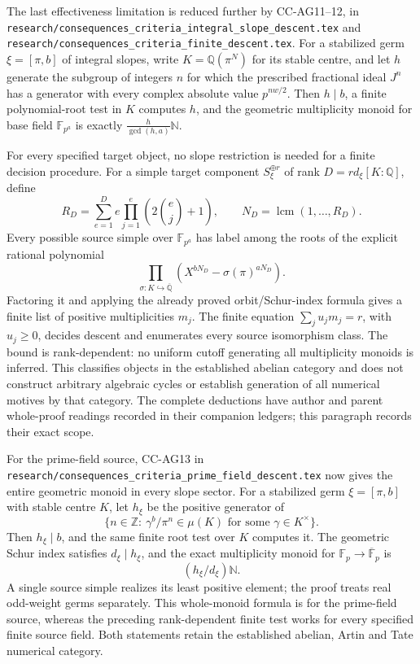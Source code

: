The last effectiveness limitation is reduced further by CC-AG11--12,
in \texttt{research/consequences\_criteria\_integral\_slope\_descent.tex}
and \texttt{research/consequences\_criteria\_finite\_descent.tex}.
For a stabilized germ $\xi=[\pi,b]$ of integral slopes, write
$K=\mathbb Q(\pi^N)$ for its stable centre, and let $h$ generate
the subgroup of integers $n$ for which the prescribed fractional
ideal $J^n$ has a generator with every complex absolute value
$p^{nw/2}$. Then $h\mid b$, a finite polynomial-root test in
$K$ computes $h$, and the geometric multiplicity monoid for
base field $\mathbb F_{p^a}$ is exactly
$\frac{h}{\gcd(h,a)}\mathbb N$.

For every specified target object, no slope restriction is
needed for a finite decision procedure. For a simple target
component $S_\xi^{\oplus r}$ of rank
$D=r d_\xi[K:\mathbb Q]$, define
\[
 R_D=\sum_{e=1}^D e\prod_{j=1}^e
       \left(2\binom ej+1\right),\qquad
 N_D=\operatorname{lcm}(1,\ldots,R_D).
\]
Every possible source simple over $\mathbb F_{p^a}$ has label
among the roots of the explicit rational polynomial
\[
 \prod_{\sigma:K\hookrightarrow\overline{\mathbb Q}}
       \left(X^{bN_D}-\sigma(\pi)^{aN_D}\right).
\]
Factoring it and applying the already proved orbit/Schur-index
formula gives a finite list of positive multiplicities $m_j$.
The finite equation $\sum_j u_jm_j=r$, with $u_j\ge0$,
decides descent and enumerates every source isomorphism class.
The bound is rank-dependent: no uniform cutoff generating
all multiplicity monoids is inferred. This classifies objects
in the established abelian category and does not construct
arbitrary algebraic cycles or establish generation of all
numerical motives by that category. The complete deductions
have author and parent whole-proof readings recorded in their
companion ledgers; this paragraph records their exact scope.

For the prime-field source, CC-AG13 in
\texttt{research/consequences\_criteria\_prime\_field\_descent.tex}
now gives the entire geometric monoid in every slope sector.
For a stabilized germ $\xi=[\pi,b]$ with stable centre $K$,
let $h_\xi$ be the positive generator of
\[
 \{n\in\mathbb Z:\ \gamma^b/\pi^n\in\mu(K)
                    \text{ for some }\gamma\in K^\times\}.
\]
Then $h_\xi\mid b$, and the same finite root test over $K$
computes it. The geometric Schur index satisfies
$d_\xi\mid h_\xi$, and the exact multiplicity monoid for
$\mathbb F_p\to\overline{\mathbb F}_p$ is
\[
                    (h_\xi/d_\xi)\mathbb N.
\]
A single source simple realizes its least positive element;
the proof treats real odd-weight germs separately. This whole-monoid
formula is for the prime-field source, whereas the preceding
rank-dependent finite test works for every specified finite
source field. Both statements retain the established abelian,
Artin and Tate numerical category.

